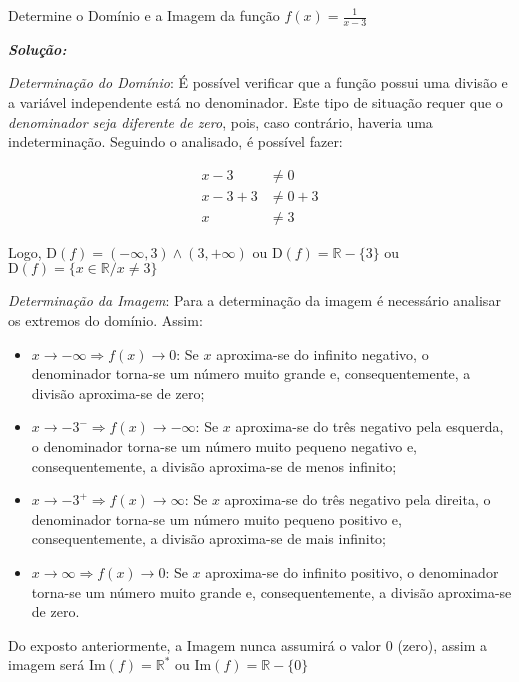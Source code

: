 \begin{example}
	Determine o Domínio e a Imagem da função $f(x)=\frac{1}{x-3}$

\vspace{.5cm}
\textit{\textbf{Solução:}}

\textit{Determinação do Domínio}: É possível verificar que a função possui uma divisão e a variável independente está no denominador. Este tipo de situação requer que o \textit{denominador seja diferente de zero}, pois, caso contrário, haveria uma indeterminação. Seguindo o analisado, é possível fazer:

\begin{ceqn}
	\begin{align*}
	x-3 &\neq 0 \\
	x-3 +3 & \neq 0+3 \\
	x &\neq 3
	\end{align*}
\end{ceqn}
Logo, $\mathrm{D}(f)=(-\infty,3) \wedge (3,+\infty)$ ou $\mathrm{D}(f)= \mathbb{R}-\{3\}$ ou $\mathrm{D}(f)=\{x \in \mathbb{R}/ x \neq 3\}$

\vspace{.5cm}
\textit{Determinação da Imagem}: Para a determinação da imagem é necessário analisar os extremos do domínio. Assim:

\vspace{.5cm}
\begin{itemize}
	\item{$x \rightarrow -\infty \Rightarrow f(x) \rightarrow 0$: Se $x$ aproxima-se do infinito negativo, o denominador torna-se um número muito grande e, consequentemente, a divisão aproxima-se de zero;}
	\item{$x \rightarrow -3^{-} \Rightarrow f(x) \rightarrow -\infty$: Se $x$ aproxima-se do três negativo pela esquerda, o denominador torna-se um número muito pequeno negativo e, consequentemente, a divisão aproxima-se de menos infinito;}
	\item{$x \rightarrow -3^{+} \Rightarrow f(x) \rightarrow \infty$: Se $x$ aproxima-se do três negativo pela direita, o denominador torna-se um número muito pequeno positivo e, consequentemente, a divisão aproxima-se de mais infinito;}
	\item{$x \rightarrow \infty \Rightarrow f(x) \rightarrow 0$: Se $x$ aproxima-se do infinito positivo, o denominador torna-se um número muito grande e, consequentemente, a divisão aproxima-se de zero.}
\end{itemize}

\vspace{.5cm}
Do exposto anteriormente, a Imagem nunca assumirá o valor $0$ (zero), assim a imagem será $\mathrm{Im}(f)=\mathbb{R}^{*}$ ou $\mathrm{Im}(f)=\mathbb{R}-\{0\}$
\end{example}

